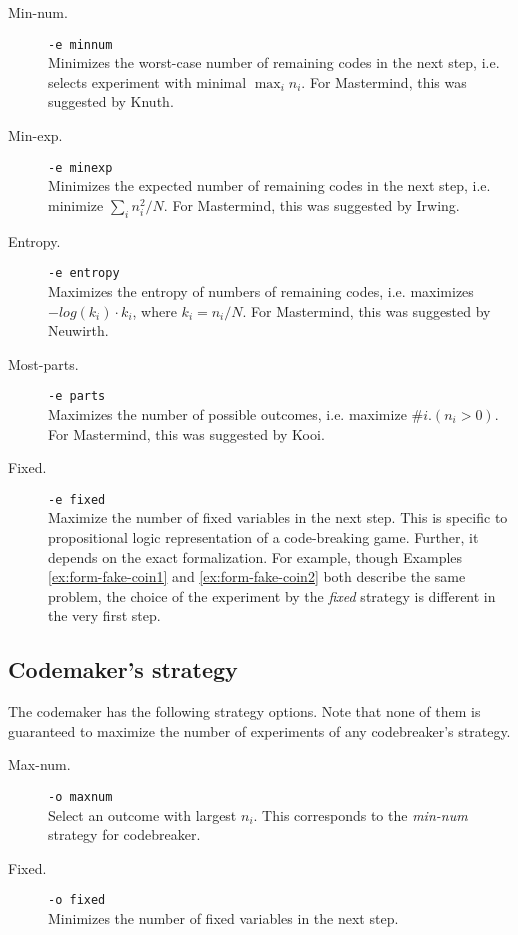 \begin{description}
\item[Min-num.] \texttt{-e minnum} \\
  Minimizes the worst-case number of remaining codes
  in the next step, i.e. selects experiment with minimal $\max_i n_i$.
  For Mastermind, this was suggested by Knuth\cite{mm-knuth}.
\item[Min-exp.]  \texttt{-e minexp} \\
   Minimizes the expected number of remaining codes
  in the next step, i.e. minimize $\sum_in_i^2/N$.
  For Mastermind, this was suggested by Irwing\cite{mm-expnum}.
\item[Entropy.] \texttt{-e entropy} \\
  Maximizes the entropy of numbers of remaining codes,
  i.e. maximizes $-log(k_i)\cdot k_i$, where $k_i=n_i/N$.
  For Mastermind, this was suggested by Neuwirth\cite{mm-entropy}.
\item[Most-parts.] \texttt{-e parts} \\
  Maximizes the number of possible outcomes,
  i.e. maximize $\# i. (n_i > 0)$.
  For Mastermind, this was suggested by Kooi\cite{mm-mostparts}.
\item[Fixed.] \texttt{-e fixed} \\
  Maximize the number of fixed variables
  in the next step.
  This is specific to propositional logic representation of a code-breaking game.
  Further, it depends on the exact formalization.
  For example, though Examples \ref{ex:form-fake-coin1}
  and \ref{ex:form-fake-coin2} both describe the same problem,
  the choice of the experiment by the \emph{fixed} strategy is
  different in the very first step.
\end{description}

\subsection{Codemaker's strategy}

The codemaker has the following strategy options.
Note that none of them is guaranteed to maximize the
  number of experiments of any codebreaker's strategy.

\begin{description}
\item[Max-num.] \texttt{-o maxnum} \\
  Select an outcome with largest $n_i$. This
  corresponds to the \emph{min-num} strategy for codebreaker.
\item[Fixed.] \texttt{-o fixed} \\
  Minimizes the number of fixed variables in the next step.
\end{description}

